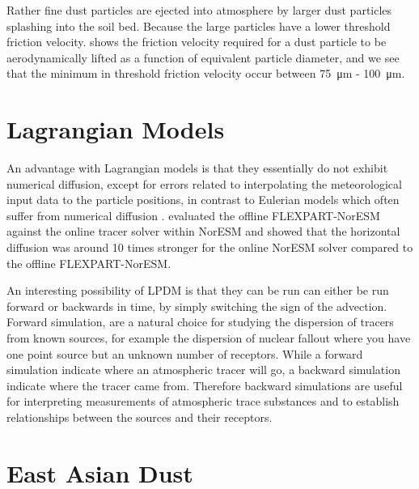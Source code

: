 Rather fine dust particles are ejected into atmosphere by larger dust particles splashing into the soil bed. Because the large particles have a  lower threshold friction velocity.  shows the friction velocity required for a dust particle to be aerodynamically lifted as a function of equivalent particle diameter, and we see that the minimum in threshold friction velocity occur between \SI{75}{\micro\metre} - \SI{100}{\micro\metre}.

\section{Lagrangian Models}
An advantage with Lagrangian models is that they essentially do not exhibit numerical diffusion, except for errors related to interpolating the meteorological input data to the particle positions, in contrast to Eulerian models which often suffer from numerical diffusion \parencite{cassiani_offline_2016}. \textcite{cassiani_offline_2016} evaluated the offline FLEXPART-NorESM against the online tracer solver within NorESM and showed that the horizontal diffusion was around 10 times stronger for the online NorESM solver compared to the offline FLEXPART-NorESM. 

An interesting possibility of LPDM is that they can be run can either be run forward or backwards in time, by simply switching the sign of the advection. Forward simulation, are a natural choice for studying the dispersion of tracers from known sources, for example the dispersion of nuclear fallout where you have one point source but an unknown number of receptors. While a forward simulation indicate where an atmospheric tracer will go, a backward simulation indicate where the tracer came from. Therefore backward simulations are useful for interpreting measurements of atmospheric trace substances and to establish relationships between the sources and their receptors.  


\section{East Asian Dust}

